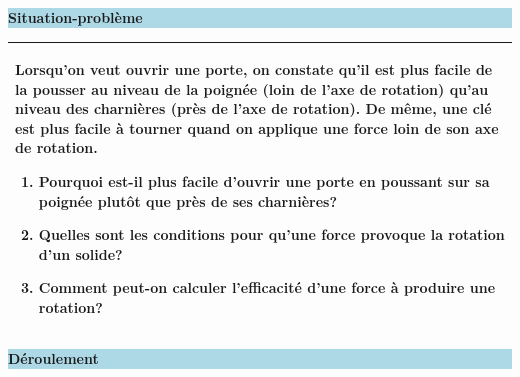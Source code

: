 \documentclass[12pt]{article}
\begin{document}
\begin{center}
\colorbox{lightblue}{\parbox{15cm}{\centering\textbf{Situation-problème}}}
\end{center}

\begin{tabular}{|p{16cm}|}
\hline
Lorsqu'on veut ouvrir une porte, on constate qu'il est plus facile de la pousser au niveau de la poignée (loin de l'axe de rotation) qu'au niveau des charnières (près de l'axe de rotation). De même, une clé est plus facile à tourner quand on applique une force loin de son axe de rotation.

\begin{enumerate}
\item Pourquoi est-il plus facile d'ouvrir une porte en poussant sur sa poignée plutôt que près de ses charnières?
\item Quelles sont les conditions pour qu'une force provoque la rotation d'un solide?
\item Comment peut-on calculer l'efficacité d'une force à produire une rotation?
\end{enumerate} \\
\hline
\end{tabular}

\vspace{1cm}

\begin{center}
\colorbox{lightblue}{\parbox{15cm}{\centering\textbf{Déroulement}}}
\end{center}
\end{document}
